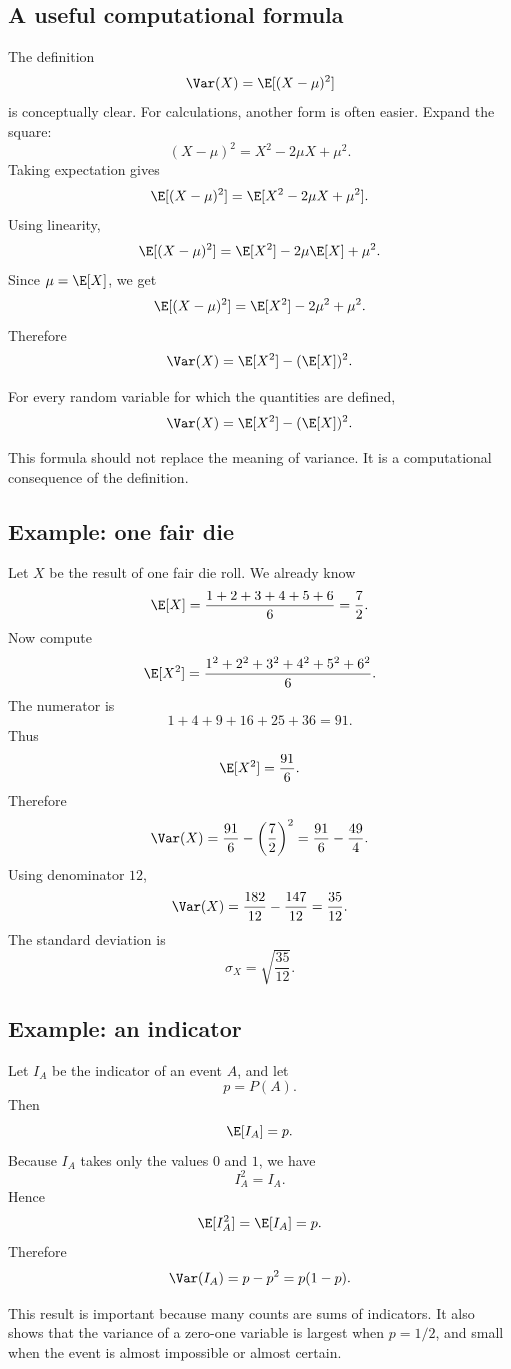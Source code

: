 \subsection*{A useful computational formula}

The definition
\[
\Var(X)=\E[(X-\mu)^2]
\]
is conceptually clear. For calculations, another form is often easier. Expand
the square:
\[
(X-\mu)^2=X^2-2\mu X+\mu^2.
\]
Taking expectation gives
\[
\E[(X-\mu)^2]=\E[X^2-2\mu X+\mu^2].
\]
Using linearity,
\[
\E[(X-\mu)^2]=\E[X^2]-2\mu\E[X]+\mu^2.
\]
Since \(\mu=\E[X]\), we get
\[
\E[(X-\mu)^2]=\E[X^2]-2\mu^2+\mu^2.
\]
Therefore
\[
\Var(X)=\E[X^2]-(\E[X])^2.
\]

\begin{theorembox}
For every random variable for which the quantities are defined,
\[
\Var(X)=\E[X^2]-(\E[X])^2.
\]
\end{theorembox}

This formula should not replace the meaning of variance. It is a computational
consequence of the definition.

\subsection*{Example: one fair die}

Let \(X\) be the result of one fair die roll. We already know
\[
\E[X]=\frac{1+2+3+4+5+6}{6}=\frac72.
\]
Now compute
\[
\E[X^2]=\frac{1^2+2^2+3^2+4^2+5^2+6^2}{6}.
\]
The numerator is
\[
1+4+9+16+25+36=91.
\]
Thus
\[
\E[X^2]=\frac{91}{6}.
\]
Therefore
\[
\Var(X)=\frac{91}{6}-\left(\frac72\right)^2
=\frac{91}{6}-\frac{49}{4}.
\]
Using denominator \(12\),
\[
\Var(X)=\frac{182}{12}-\frac{147}{12}=\frac{35}{12}.
\]
The standard deviation is
\[
\sigma_X=\sqrt{\frac{35}{12}}.
\]

\subsection*{Example: an indicator}

Let \(I_A\) be the indicator of an event \(A\), and let
\[
p=P(A).
\]
Then
\[
\E[I_A]=p.
\]
Because \(I_A\) takes only the values \(0\) and \(1\), we have
\[
I_A^2=I_A.
\]
Hence
\[
\E[I_A^2]=\E[I_A]=p.
\]
Therefore
\[
\Var(I_A)=p-p^2=p(1-p).
\]

This result is important because many counts are sums of indicators. It also
shows that the variance of a zero-one variable is largest when \(p=1/2\), and
small when the event is almost impossible or almost certain.

